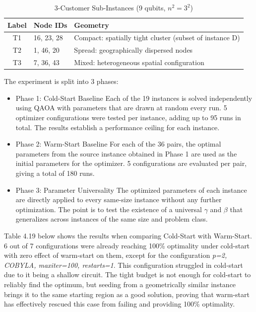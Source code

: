 \documentclass[a4paper]{report}
\begin{document}
{\begin{itemize}
\begin{itemize}
\begin{table}[h]
\centering
\begin{tabular}{cll}
\hline
\textbf{Label} & \textbf{Node IDs} & \textbf{Geometry} \\
\hline
T1 & 16, 23, 28 & Compact: spatially tight cluster (subset of instance D) \\
T2 & 1, 46, 20  & Spread: geographically dispersed nodes \\
T3 & 7, 36, 43  & Mixed: heterogeneous spatial configuration \\
\hline
\end{tabular}
\caption{3-Customer Sub-Instances (9 qubits, $n^2 = 3^2$)}
\label{tab:instances-3cust}
\end{table}

The experiment is split into 3 phases:
\begin{itemize}
    \item Phase 1: Cold-Start Baseline\newline
    Each of the 19 instances is solved independently using QAOA with parameters that are drawn at random every run. 5 optimizer configurations were tested per instance, adding up to 95 runs in total. The results establish a performance ceiling for each instance.
    \item Phase 2: Warm-Start Baseline\newline
    For each of the 36 pairs, the optimal parameters from the source instance obtained in Phase 1 are used as the initial parameters for the optimizer. 5 configurations are evaluated per pair, giving a total of 180 runs.
    \item Phase 3: Parameter Universality\newline
    The optimized parameters of each instance are directly applied to every same-size instance without any further optimization. The point is to test the existence of a universal $\gamma$ and $\beta$ that generalizes across instances of the same size and problem class.
\end{itemize}

Table 4.19 below shows the results when comparing Cold-Start with Warm-Start. 6 out of 7 configurations were already reaching 100\% optimality under cold-start with zero effect of warm-start on them, except for the  configuration \textit{p=2, COBYLA, maxiter=100, restarts=1}. This configuration struggled in cold-start due to it being a shallow circuit. The tight budget is not enough for cold-start to reliably find the optimum, but seeding from a geometrically similar instance brings it to the same starting region as a good solution, proving that warm-start has effectively rescued this case from failing and providing 100\% optimality.


\end{itemize}
\end{itemize}}
\end{document}
